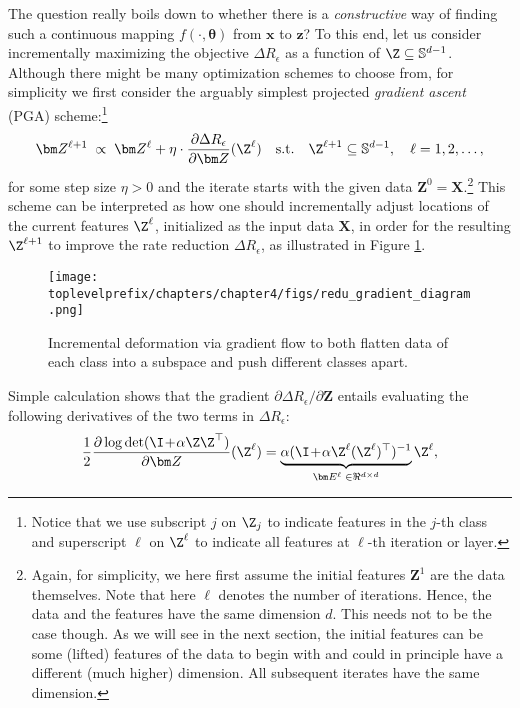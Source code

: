 \documentclass[../../book-main.tex]{subfiles}
\begin{document}
The question really boils down to whether there is a {\em constructive} way of finding such a continuous mapping $f(\cdot,\bm \theta)$ from $\bm x$ to $\bm z$? To this end, let us consider incrementally maximizing the objective $\Delta R_{\epsilon}$ as a function of $\Z \subseteq \mathbb{S}^{d-1}$. Although there might be many optimization schemes to choose from, for simplicity we first consider the arguably simplest projected {\em gradient ascent} (PGA)  scheme:\footnote{Notice that we use subscript $j$ on $\Z_j$ to indicate features in the $j$-th class and superscript $\ell$ on $\Z^{\ell}$ to indicate all features at $\ell$-th iteration or layer.} 
\begin{equation}
\bm Z^{\ell+1}   \; \propto \; \bm Z^{\ell} + \eta \cdot \frac{\partial \Delta R_{\epsilon}}{\partial \bm Z}(\Z^{\ell})
\quad \mbox{s.t.} \quad \Z^{\ell+1} \subseteq \mathbb{S}^{d-1}, \quad \ell = 1, 2, \ldots,
\label{eqn:gradient-descent}
\end{equation}
for some step size $\eta >0$ and the iterate starts with the given data $\bm Z^{0} = \bm X$.\footnote{Again, for simplicity, we here first assume the initial features $\bm Z^{1}$ are the data themselves. Note that here $\ell$ denotes the number of iterations. Hence, the data and the features have the same dimension $d$. This needs not to be the case though. As we will see in the next section, the initial features can be some (lifted) features of the data to begin with and could in principle have a different (much higher) dimension. All subsequent iterates have the same dimension.}
This scheme can be interpreted as how one should incrementally adjust locations of the current features $\Z^\ell$, initialized as the input data $\bm X$, in order for the resulting $\Z^{\ell +1}$ to improve the rate reduction $\Delta R_{\epsilon}$, as illustrated in Figure \ref{fig:gradient-flow}. 
\begin{figure}
\centering
    \texttt{[image: \\toplevelprefix/chapters/chapter4/figs/redu\_gradient\_diagram.png]} 
    \caption{Incremental deformation via gradient flow to both flatten data of each class into a subspace and push different classes apart.} 
    \label{fig:gradient-flow}
\end{figure} 


Simple calculation shows that the gradient ${\partial \Delta R_{\epsilon}}/{\partial \bm Z}$ entails evaluating the following derivatives of the two terms in $\Delta R_{\epsilon}$:
\begin{equation}\label{eqn:expand-directions}
    \frac{1}{2}\frac{\partial \log \det (\I \!+\! \alpha \Z \Z^{\top} )}{\partial \bm Z}(\Z^\ell) = \underbrace{\alpha(\I \!+\! \alpha\Z^\ell (\Z^\ell)^\top)^{-1}}_{\bm E^{\ell} \; \in \Re^{d\times d}}\Z^\ell,
\end{equation}
\end{document}
